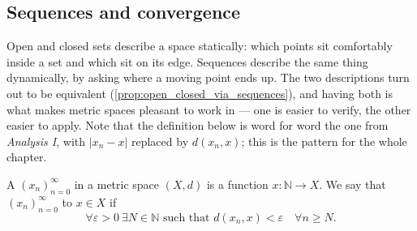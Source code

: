 \subsection{Sequences and convergence}

Open and closed sets describe a space statically: which points sit comfortably inside a set and
which sit on its edge. Sequences describe the same thing dynamically, by asking where a moving
point ends up. The two descriptions turn out to be equivalent
(\cref{prop:open_closed_via_sequences}), and having both is what makes metric spaces pleasant to
work in --- one is easier to verify, the other easier to apply. Note that the definition below
is word for word the one from \emph{Analysis I}, with $|x_n - x|$ replaced by $d(x_n,x)$; this
is the pattern for the whole chapter.

\begin{definition}
\label{def:convergent_sequence}
A  $(x_n)_{n=0}^{\infty}$ in a metric space $(X,d)$ is a function
$x : \mathbb{N} \to X$. We say that $(x_n)_{n=0}^{\infty}$  to $x \in X$ if
\[\forall \varepsilon > 0 \ \exists N \in \mathbb{N} \text{ such that } d(x_n, x) < \varepsilon \quad \forall n \geq N.\]
\end{definition}

\begin{center}
\end{center}

